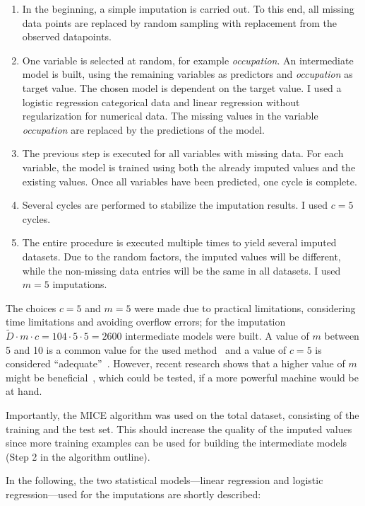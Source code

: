 \documentclass[a4paper]{article}
\begin{document}
\begin{enumerate}
\item In the beginning, a simple imputation is carried out. To
  this end, all missing data points are replaced by random sampling
  with replacement from the observed datapoints.
\item One variable is selected at random, for example
  \emph{occupation}. An intermediate model is built, using the
  remaining variables as predictors and \emph{occupation} as target
  value. The chosen model is dependent on the target value. I used a
  logistic regression categorical data and linear regression without
  regularization for numerical data. The missing values in the
  variable \emph{occupation} are replaced by the predictions of the
  model.
\item The previous step is executed for all variables with missing
  data. For each variable, the model is trained using both the already
  imputed values and the existing values. Once all variables have been
  predicted, one cycle is complete.
\item Several cycles are performed to stabilize the imputation
  results. I used $c = 5$ cycles.
\item The entire procedure is executed multiple times to yield
  several imputed datasets. Due to the random factors, the imputed
  values will be different, while the non-missing data entries will be
  the same in all datasets. I used $m = 5$ imputations.
\end{enumerate}
The choices $c = 5$ and $m = 5$ were made due to practical
limitations, considering time limitations and avoiding overflow
errors; for the imputation
$\tilde{D} \cdot m \cdot c = 104 \cdot 5 \cdot 5 = 2600$ intermediate
models were built. A value of $m$ between 5 and 10 is a common value
for the used method~\cite{royston2011multiple} and a value of $c = 5$
is considered ``adequate''~\cite{van1999multiple}. However, recent
research shows that a higher value of $m$ might be
beneficial~\cite{white2011multiple}, which could be tested, if a more
powerful machine would be at hand.

Importantly, the MICE algorithm was used on the total dataset,
consisting of the training and the test set. This should increase the
quality of the imputed values since more training examples can be used
for building the intermediate models (Step 2 in the algorithm
outline).

In the following, the two statistical models---linear regression and
logistic regression---used for the imputations are shortly described:
\end{document}
